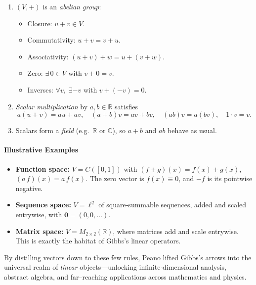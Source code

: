 \begin{enumerate}
  \item \((V,+)\) is an \emph{abelian group}:
    \begin{itemize}
      \item Closure: \(u+v\in V\).
      \item Commutativity: \(u+v=v+u\).
      \item Associativity: \((u+v)+w = u+(v+w)\).
      \item Zero: \(\exists\,0\in V\) with \(v+0=v\).
      \item Inverses: \(\forall v,\;\exists -v\) with \(v+(-v)=0\).
    \end{itemize}
  \item \emph{Scalar multiplication} by \(a,b\in\mathbb R\) satisfies
    \[
      a(u+v)=au+av,\quad
      (a+b)v = av+bv,\quad
      (ab)v = a(bv),\quad
      1\cdot v = v.
    \]
  \item Scalars form a \emph{field} (e.g.\ \(\mathbb R\) or \(\mathbb C\)), so \(a+b\) and \(ab\) behave as usual.
\end{enumerate}

\paragraph{Illustrative Examples}

\begin{itemize}
  \item \textbf{Function space:}  
    \(V = C([0,1])\) with \((f+g)(x)=f(x)+g(x)\), \((a\,f)(x)=a\,f(x)\).  
    The zero vector is \(f(x)\equiv0\), and \(-f\) is its pointwise negative.
  \item \textbf{Sequence space:}  
    \(V=\ell^2\) of square‐summable sequences, added and scaled entrywise, with \(\mathbf0=(0,0,\dots)\).
  \item \textbf{Matrix space:}  
    \(V=M_{2\times2}(\mathbb R)\), where matrices add and scale entrywise.  
    This is exactly the habitat of Gibbs’s linear operators.
\end{itemize}

By distilling vectors down to these few rules, Peano lifted Gibbs’s arrows into the universal realm of \emph{linear} objects—unlocking infinite‐dimensional analysis, abstract algebra, and far–reaching applications across mathematics and physics.  



\bigskip

